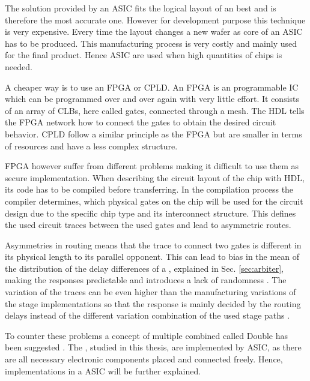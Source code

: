 The solution provided by an \ac{ASIC} fits the logical layout of an \apuf best and is therefore the most accurate one. %
However for development purpose this technique is very expensive.
Every time the layout changes a new wafer as core of an \ac{ASIC} has to be produced.
This manufacturing process is very costly and mainly used for the final product.
Hence \ac{ASIC} are used when high quantities of chips is needed.

A cheaper way is to use an \ac{FPGA} or \ac{CPLD}. 
An \ac{FPGA} is an programmable \ac{IC} which can be programmed over and over again with very little effort.
It consists of an array of \acp{CLB}, here called gates, connected through a mesh. %
The \ac{HDL} tells the \ac{FPGA} network how to connect the gates to obtain the desired circuit behavior. %
\ac{CPLD} follow a similar principle as the \ac{FPGA} but are smaller in terms of resources and have a less complex structure.

\ac{FPGA} however suffer from different problems making it difficult to use them as secure \apuf implementation.
When describing the circuit layout of the chip with \ac{HDL}, its code has to be compiled before transferring. %
In the compilation process the compiler determines, which physical gates on the chip will be used for the circuit design due to the specific chip type and its interconnect structure.
This defines the used circuit traces between the used gates and lead to asymmetric routes. %

Asymmetries in routing means that the trace to connect two gates is different in its physical length to its parallel opponent.
This can lead to bias in the mean of the distribution of the delay differences of a \apuf, explained in Sec. \ref{sec:arbiter}, making the responses predictable and introduces a lack of randomness \cite{Majzoobi2010FPGALines, Morozov2010AnFPGA}. %
The variation of the traces can be even higher than the manufacturing variations of the stage implementations so that the response is mainly decided by the routing delays instead of the different variation combination of the used stage paths \cite{Majzoobi2009TechniquesPUFs}.

To counter these problems a concept of multiple combined \apuf called Double \apuf has been suggested \cite{Machida2015ImplementationFPGA, Machida2015AFPGA}.
The \apufs, studied in this thesis, are implemented by \ac{ASIC}, as there are all necessary electronic components placed and connected freely.
Hence, \apuf implementations in a \ac{ASIC} will be further explained.

